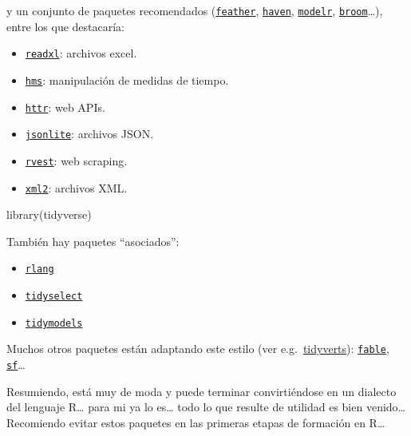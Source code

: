 \documentclass[
]{book}
\newenvironment{Shaded}{\begin{snugshade}}{\end{snugshade}}
\newcommand{\FunctionTok}[1]{\textcolor[rgb]{0.00,0.00,0.00}{#1}}
\newcommand{\NormalTok}[1]{#1}
\providecommand{\tightlist}{%
  \setlength{\itemsep}{0pt}\setlength{\parskip}{0pt}}
\theoremstyle{break}
\theoremstyle{nonumberplain}
\begin{document}
y un conjunto de paquetes recomendados (\href{https://github.com/wesm/feather}{\texttt{feather}}, \href{https://github.com/tidyverse/haven}{\texttt{haven}}, \href{https://github.com/tidyverse/modelr}{\texttt{modelr}}, \href{https://github.com/tidymodels/broom}{\texttt{broom}}\ldots), entre los que destacaría:

\begin{itemize}
\tightlist
\item
  \href{https://github.com/tidyverse/readxl}{\texttt{readxl}}: archivos excel.
\item
  \href{https://github.com/tidyverse/hms}{\texttt{hms}}: manipulación de medidas de tiempo.
\item
  \href{https://github.com/r-lib/httr}{\texttt{httr}}: web APIs.
\item
  \href{https://github.com/jeroen/jsonlite}{\texttt{jsonlite}}: archivos JSON.
\item
  \href{https://github.com/tidyverse/rvest}{\texttt{rvest}}: web scraping.
\item
  \href{https://github.com/r-lib/xml2}{\texttt{xml2}}: archivos XML.
\end{itemize}

\begin{Shaded}
\begin{Highlighting}[]
\FunctionTok{library}\NormalTok{(tidyverse)}
\end{Highlighting}
\end{Shaded}

También hay paquetes ``asociados'':

\begin{itemize}
\tightlist
\item
  \href{https://rlang.r-lib.org}{\texttt{rlang}}
\item
  \href{https://tidyselect.r-lib.org}{\texttt{tidyselect}}
\item
  \href{https://tidymodels.tidymodels.org}{\texttt{tidymodels}}
\end{itemize}

Muchos otros paquetes están adaptando este estilo (ver e.g.~\href{https://tidyverts.org/}{tidyverts}): \href{https://fable.tidyverts.org}{\texttt{fable}}, \href{https://r-spatial.github.io/sf/}{\texttt{sf}}\ldots{}

Resumiendo, está muy de moda y puede terminar convirtiéndose en un dialecto del lenguaje R\ldots{} para mi ya lo es\ldots{} todo lo que resulte de utilidad es bien venido\ldots{} Recomiendo evitar estos paquetes en las primeras etapas de formación en R\ldots{}
\end{document}
